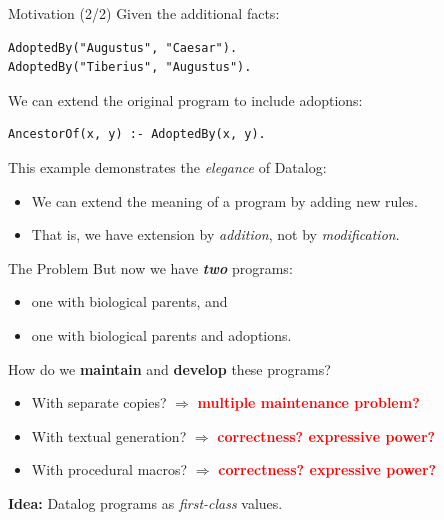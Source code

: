 \begin{frame}[fragile]{Motivation (2/2)}
Given the additional facts:

\begin{lstlisting}[language=flix, xleftmargin=0.8cm]
AdoptedBy("Augustus", "Caesar").
AdoptedBy("Tiberius", "Augustus").
\end{lstlisting}

We can extend the original program to include adoptions:

\begin{lstlisting}[language=flix, xleftmargin=0.8cm]
AncestorOf(x, y) :- AdoptedBy(x, y).
\end{lstlisting}

\pause

This example demonstrates the \emph{elegance} of Datalog:

\begin{itemize}
    \item We can extend the meaning of a program by adding new rules.
    \item That is, we have extension by \emph{addition}, not by \emph{modification}.
\end{itemize}
\end{frame}

\begin{frame}{The Problem}
But now we have \textbf{\emph{two}} programs: 

\begin{itemize}
    \item one with biological parents, and
    \item one with biological parents and adoptions.
\end{itemize}

\pause

How do we \textbf{maintain} and \textbf{develop} these programs?

\begin{itemize}
    \pause \item With separate copies? $\Rightarrow$ \textcolor{red}{\bfseries multiple maintenance problem?}
    \pause \item With textual generation? $\Rightarrow$ \textcolor{red}{\bfseries correctness? expressive power?}
    \pause \item With procedural macros? $\Rightarrow$ \textcolor{red}{\bfseries correctness? expressive power?}
\end{itemize}

\pause

\begin{center}
\large
\textbf{Idea:} Datalog programs as \emph{first-class} values.
\end{center}
\end{frame}


